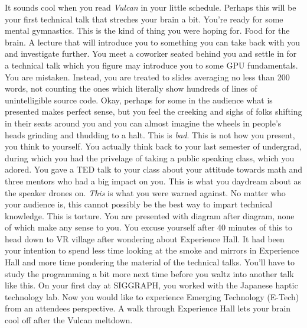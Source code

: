 \documentclass[../main.tex]{subfiles}
\begin{document}
It sounds cool when you read \textit{Vulcan} in your little schedule. Perhaps this will be your first technical talk that streches your brain a bit. You're ready for some mental gymnastics. This is the kind of thing you were hoping for. Food for the brain. A lecture that will introduce you to something you can take back with you and investigate further. You meet a coworker seated behind you and settle in for a technical talk which you figure may introduce you to some GPU fundamentals. You are mistaken. Instead, you are treated to slides averaging no less than 200 words, not counting the ones which literally show hundreds of lines of unintelligible source code. Okay, perhaps for some in the audience what is presented makes perfect sense, but you feel the creeking and sighs of folks shifting in their seats around you and you can almost imagine the wheels in people's heads grinding and thudding to a halt. This is \textit{bad}. This is not how you present, you think to yourself. You actually think back to your last semester of undergrad, during which you had the privelage of taking a public speaking class, which you adored. You gave a TED talk to your class about your attitude towards math and three mentors who had a big impact on you. This is what you daydream about as the speaker drones on. \textit{This} is what you were warned against. No matter who your audience is, this cannot possibly be the best way to impart technical knowledge. This is torture. You are presented with diagram after diagram, none of which make any sense to you. You excuse yourself after 40 minutes of this to head down to VR village after wondering about Experience Hall. It had been your intention to spend less time looking at the smoke and mirrors in Experience Hall and more time pondering the material of the technical talks. You'll have to study the programming a bit more next time before you waltz into another talk like this. On your first day at SIGGRAPH, you worked with the Japanese haptic technology lab. Now you would like to experience Emerging Technology (E-Tech) from an attendees perspective. A walk through Experience Hall lets your brain cool off after the Vulcan meltdown.
\end{document}
